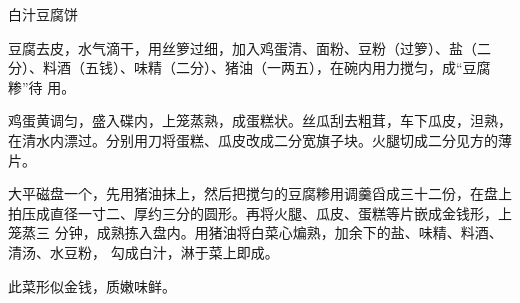 \begin{recipe}[金钱豆腐]{白汁豆腐饼}

\ingredients


\preparation

\step 豆腐去皮，水气滴干，用丝箩过细，加入鸡蛋清、面粉、豆粉（过箩）、盐（二
分）、料酒（五钱）、味精（二分）、猪油（一两五），在碗内用力搅匀，成“豆腐糁”待
用。

\step 鸡蛋黄调匀，盛入碟内，上笼蒸熟，成蛋糕状。丝瓜刮去粗茸，车下瓜皮，泹熟，
在清水内漂过。分别用刀将蛋糕、瓜皮改成二分宽旗子块。火腿切成二分见方的薄片。

\step 大平磁盘一个，先用猪油抹上，然后把搅匀的豆腐糁用调羹舀成三十二份，在盘上
拍压成直径一寸二、厚约三分的圆形。再将火腿、瓜皮、蛋糕等片嵌成金钱形，上笼蒸三
分钟，成熟拣入盘内。用猪油将白菜心煸熟，加余下的盐、味精、料酒、清汤、水豆粉，
勾成白汁，淋于菜上即成。

\features

此菜形似金钱，质嫩味鲜。

\end{recipe}


